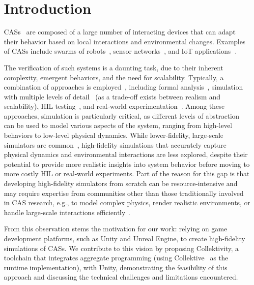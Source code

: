 \documentclass[runningheads]{llncs}
\begin{document}
\section{Introduction}

\acp{CAS}~\cite{DBLP:conf/birthday/BucchiaroneM19} are composed of a large number of interacting devices that can adapt their behavior based on local interactions and environmental changes.
%
Examples of \acp{CAS} include swarms of robots~\cite{DBLP:conf/acsos/AguzziBCMPPV25},
sensor networks~\cite{DBLP:conf/mobicom/MainwaringCPSA02,DBLP:journals/tosn/IngelrestBSVCP10},
and \ac{IoT} applications~\cite{DBLP:journals/internet/AguzziCPV22}.

The verification of such systems is a daunting task,
due to their inherent complexity, emergent behaviors, and the need for scalability.
%
Typically, a combination of approaches is employed~\cite{Abeywickrama2025,DBLP:journals/ras/DixonWFZ12},
including formal analysis~\cite{DBLP:journals/ras/KonurDF12},
simulation with multiple levels of detail~\cite{DBLP:journals/jos/PianiniMV13,DBLP:journals/swarm/PinciroliTOPBBMFCDBGD12,DBLP:journals/jirs/PlattR22}
(as a trade-off exists between realism and scalability),
\ac{HIL} testing~\cite{Sende2024},
and real-world experimentation~\cite{DBLP:journals/scirobotics/ZhouWWGLWYLCXG22,Werfel2014}.
%
Among these approaches,
simulation is particularly critical,
as different levels of abstraction can be used to model various aspects of the system,
ranging from high-level behaviors to low-level physical dynamics.
%
While lower-fidelity, large-scale simulators are common~\cite{DBLP:journals/computation/Calderon-ArceBS22},
high-fidelity simulations that accurately capture physical dynamics and environmental interactions are less explored,
despite their potential to provide more realistic insights into system behavior
before moving to more costly \ac{HIL} or real-world experiments.
%
Part of the reason for this gap is that developing high-fidelity simulators from scratch can be resource-intensive
and may require expertise from communities other than those traditionally involved in \ac{CAS} research,
e.g., to model complex physics, render realistic environments, or handle large-scale interactions efficiently~\cite{Wolf2020,DBLP:conf/fsr/ShahDLK17}.

From this observation stems the motivation for our work:
relying on game development platforms, such as Unity and Unreal Engine, to create high-fidelity simulations of \acp{CAS}.
%
We contribute to this vision by proposing Collektivity,
a toolchain that integrates aggregate programming
(using Collektive~\cite{DBLP:conf/acsos/Cortecchia24} as the runtime implementation),
with Unity,
demonstrating the feasibility of this approach and discussing the technical challenges and limitations encountered.
\end{document}
